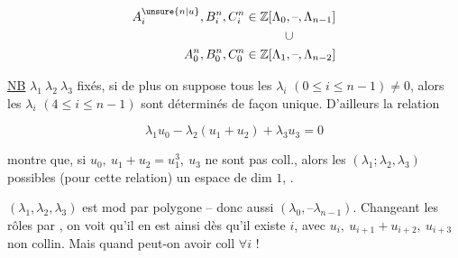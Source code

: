
\[
\begin{aligned}
A_i^{\unsure{n|u}},B_i^n,C_i^n&\in\mathbb Z[\Lambda_0,\text{--},\Lambda_{n-1}]\\
&\hspace{3.2em}\cup\\
A_0^n,B_0^n,C_0^n&\in\mathbb Z[\Lambda_1,\text{--},\Lambda_{n-2}]
\end{aligned}
\]


\uline{NB}   $\lambda_1\ \lambda_2\ \lambda_3$ fixés,  si de plus on suppose tous les  $\lambda_i$ $(0\leq i\leq n-1)\ne0$, alors les $\lambda_i$ $(4\leq i\leq n-1)$ sont déterminés de façon unique. D'ailleurs la relation

\[
\lambda_1u_0-\lambda_2(u_1+u_2)+\lambda_3u_3=0
\]

montre que, si $u_0,\ u_1+u_2=u_1^3,\ u_3$ ne sont pas coll., alors les $(\lambda_1;\lambda_2,\lambda_3)$ possibles (pour cette relation)  un espace de dim $1$,  .


$(\lambda_1,\lambda_2,\lambda_3)$ est  mod  par polygone -- donc aussi $(\lambda_0,\text{--}\lambda_{n-1})$. Changeant les rôles par , on voit qu'il en est ainsi dès qu'il existe $i$, avec $u_i,\ u_{i+1}+u_{i+2},\ u_{i+3}$ non collin. Mais quand peut-on avoir   coll $\forall i$ !

